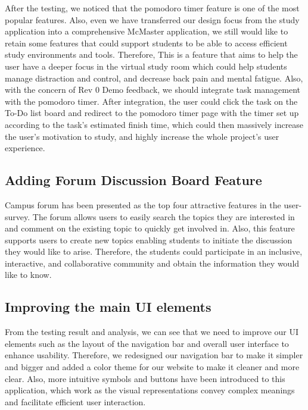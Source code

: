 \documentclass[12pt, titlepage]{article}
\begin{document}
After the testing, we noticed that the pomodoro timer feature is one of the most popular features. Also, even we have transferred our design focus from the study application into a comprehensive McMaster application, we still would like to retain some features that could support students to be able to access efficient study environments and tools. Therefore, This is a feature that aims to help the user have a deeper focus in the virtual study room which could help students manage distraction and control, and decrease back pain and mental fatigue. Also, with the concern of Rev 0 Demo feedback, we should integrate task management with the pomodoro timer. After integration, the user could click the task on the To-Do list board and redirect to the pomodoro timer page with the timer set up according to the task's estimated finish time, which could then massively increase the user’s motivation to study, and highly increase the whole project's user experience.

\subsection{Adding Forum Discussion Board Feature}\label{FDBD}

 Campus forum has been presented as the top four attractive features in the user-survey. The forum allows users to easily search the topics they are interested in and comment on the existing topic to quickly get involved in. Also, this feature supports users to create new topics enabling students to initiate the discussion they would like to arise. Therefore, the students could participate in an inclusive,  interactive, and collaborative community and obtain the information they would like to know. 
 
\subsection{Improving the main UI elements}\label{IMUI}
From the testing result and analysis, we can see that we need to improve our UI elements such as the layout of the navigation bar and overall user interface to enhance usability. Therefore, we redesigned our navigation bar to make it simpler and bigger and added a color theme for our website to make it cleaner and more clear. Also, more intuitive symbols and buttons have been introduced to this application, which work as the visual representations convey complex meanings and facilitate efficient user interaction.
\end{document}
